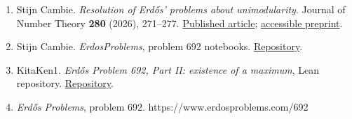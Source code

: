 \documentclass[
  11pt,
]{article}
\providecommand{\tightlist}{%
  \setlength{\itemsep}{0pt}\setlength{\parskip}{0pt}}
\begin{document}
\begin{enumerate}
\def\labelenumi{\arabic{enumi}.}
\tightlist
\item
  Stijn Cambie. \emph{Resolution of Erdős' problems about
  unimodularity}. Journal of Number Theory \textbf{280} (2026),
  271--277. \href{https://doi.org/10.1016/j.jnt.2025.08.014}{Published
  article}; \href{https://arxiv.org/abs/2501.10333}{accessible
  preprint}.
\item
  Stijn Cambie. \emph{ErdosProblems}, problem 692 notebooks.
  \href{https://github.com/StijnCambie/ErdosProblems/tree/main/Erdosproblem692}{Repository}.
\item
  KitaKen1. \emph{Erdős Problem 692, Part II: existence of a maximum},
  Lean repository.
  \href{https://github.com/KitaKen1/erdos-692-part-ii-lean}{Repository}.
\item
  \emph{Erdős Problems}, problem 692. https://www.erdosproblems.com/692
\end{enumerate}
\end{document}
